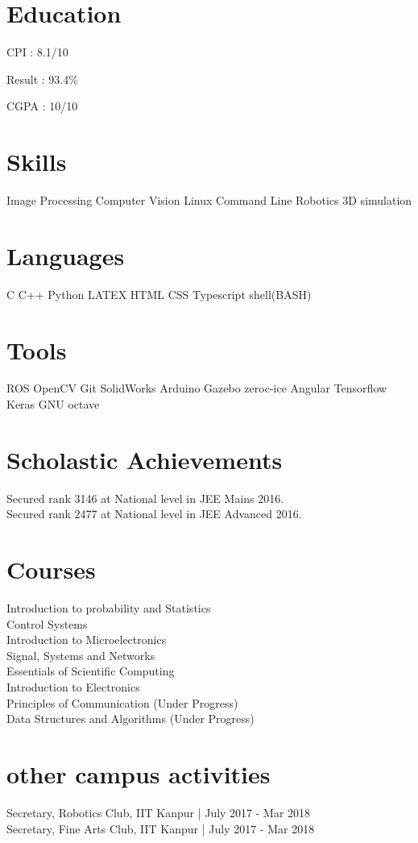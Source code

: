 \documentclass[]{deedy-resume-openfont}
\begin{document}
\sectionsep

\section{Education}

CPI : 8.1/10
\sectionsep

Result : 93.4\%
\sectionsep

CGPA : 10/10
\sectionsep

\section{Skills}
Image Processing \textbullet{} Computer Vision \textbullet{} Linux Command Line \textbullet{} Robotics \textbullet{} 3D simulation
\section{Languages}
C \textbullet{}   C++ \textbullet{} Python \textbullet{} LATEX \textbullet{} HTML \textbullet{} CSS \textbullet{} Typescript \textbullet{} shell(BASH)
\section{Tools}
ROS \textbullet{} OpenCV \textbullet{} Git \textbullet{} SolidWorks \textbullet{} Arduino \textbullet{} Gazebo \textbullet{} zeroc-ice \textbullet{} Angular \textbullet{} Tensorflow \textbullet{} Keras \textbullet{} GNU octave
\sectionsep
\hfill

\section{Scholastic Achievements}
 Secured rank 3146 at National level in JEE Mains 2016. \\ 
 Secured rank 2477 at National level in JEE Advanced 2016.
\sectionsep

\section{Courses}
Introduction to probability and Statistics \\
Control Systems \\
Introduction to Microelectronics \\
Signal, Systems and Networks \\
Essentials of Scientific Computing \\
Introduction to Electronics \\
Principles of Communication (Under Progress) \\
Data Structures and Algorithms (Under Progress)
\sectionsep

\section{other campus activities}
Secretary, Robotics Club, IIT Kanpur | July 2017 - Mar 2018 \\
Secretary, Fine Arts Club, IIT Kanpur | July 2017 - Mar 2018 \\
\end{document}

